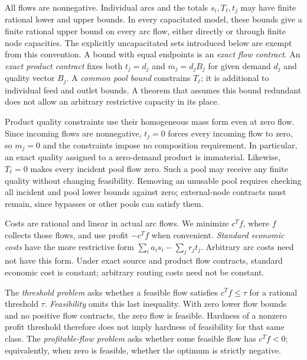 All flows are nonnegative. Individual arcs and the totals $s_i,T_\ell,t_j$
may have finite rational lower and upper bounds. In every capacitated
model, these bounds give a finite rational upper bound on every arc flow,
either directly or through finite node capacities. The explicitly
uncapacitated sets introduced below are exempt from this convention.
A bound with equal
endpoints is an \emph{exact flow contract}. An \emph{exact product
contract} fixes both $t_j=d_j$ and $m_j=d_jB_j$ for given demand $d_j$
and quality vector $B_j$. A \emph{common pool bound} constrains $T_\ell$;
it is additional to individual feed and outlet bounds. A theorem that
assumes this bound redundant does not allow an arbitrary restrictive
capacity in its place.

Product quality constraints use their homogeneous mass form even at
zero flow. Since incoming flows are nonnegative, $t_j=0$ forces every
incoming flow to zero, so $m_j=0$ and the constraints impose no composition
requirement. In particular, an exact quality assigned to a zero-demand
product is immaterial. Likewise, $T_\ell=0$ makes every incident pool
flow zero. Such a pool may receive any finite quality without changing
feasibility. Removing an unusable pool requires checking all incident
and pool lower bounds against zero; external-node contracts must remain,
since bypasses or other pools can satisfy them.

Costs are rational and linear in actual arc flows. We minimize $c^Tf$,
where $f$ collects those flows, and use profit $-c^Tf$ when convenient.
\emph{Standard economic costs} have the more restrictive form
$\sum_i a_i s_i-\sum_j r_jt_j$. Arbitrary arc costs need not have this
form. Under exact source and product flow contracts, standard economic
cost is constant; arbitrary routing costs need not be constant.

The \emph{threshold problem} asks whether a feasible flow satisfies
$c^Tf\le\tau$ for a rational threshold $\tau$. \emph{Feasibility} omits
this last inequality. With zero lower flow bounds and no positive flow
contracts, the zero flow is feasible. Hardness of a nonzero profit
threshold therefore does not imply hardness of feasibility for that
same class. The \emph{profitable-flow problem} asks whether some feasible
flow has $c^Tf<0$; equivalently, when zero is feasible, whether the optimum
is strictly negative.

